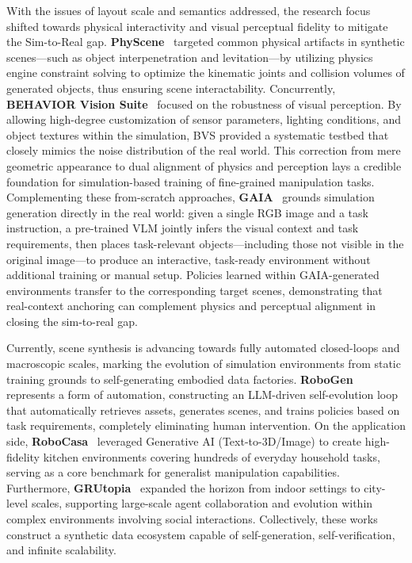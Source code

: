 \documentclass[acmsmall,screen,review,anonymous]{acmart}
\begin{document}
With the issues of layout scale and semantics addressed, the research focus shifted towards physical interactivity and visual perceptual fidelity to mitigate the Sim-to-Real gap. \textbf{PhyScene}~\cite{yang2024physcene} targeted common physical artifacts in synthetic scenes—such as object interpenetration and levitation—by utilizing physics engine constraint solving to optimize the kinematic joints and collision volumes of generated objects, thus ensuring scene interactability. Concurrently, \textbf{BEHAVIOR Vision Suite}~\cite{ge2024bvs} focused on the robustness of visual perception. By allowing high-degree customization of sensor parameters, lighting conditions, and object textures within the simulation, BVS provided a systematic testbed that closely mimics the noise distribution of the real world. This correction from mere geometric appearance to dual alignment of physics and perception lays a credible foundation for simulation-based training of fine-grained manipulation tasks. Complementing these from-scratch approaches, \textbf{GAIA}~\cite{ko2026gaia} grounds simulation generation directly in the real world: given a single RGB image and a task instruction, a pre-trained VLM jointly infers the visual context and task requirements, then places task-relevant objects---including those not visible in the original image---to produce an interactive, task-ready environment without additional training or manual setup. Policies learned within GAIA-generated environments transfer to the corresponding target scenes, demonstrating that real-context anchoring can complement physics and perceptual alignment in closing the sim-to-real gap.

Currently, scene synthesis is advancing towards fully automated closed-loops and macroscopic scales, marking the evolution of simulation environments from static training grounds to self-generating embodied data factories. \textbf{RoboGen}~\cite{wang2023robogen} represents a form of automation, constructing an LLM-driven self-evolution loop that automatically retrieves assets, generates scenes, and trains policies based on task requirements, completely eliminating human intervention. On the application side, \textbf{RoboCasa}~\cite{nasiriany2024robocasa} leveraged Generative AI (Text-to-3D/Image) to create high-fidelity kitchen environments covering hundreds of everyday household tasks, serving as a core benchmark for generalist manipulation capabilities. Furthermore, \textbf{GRUtopia}~\cite{wang2024grutopia} expanded the horizon from indoor settings to city-level scales, supporting large-scale agent collaboration and evolution within complex environments involving social interactions. Collectively, these works construct a synthetic data ecosystem capable of self-generation, self-verification, and infinite scalability.
\end{document}
